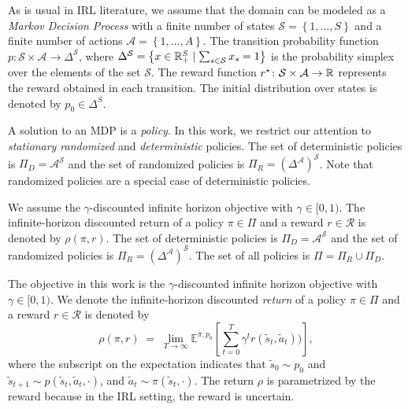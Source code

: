 \documentclass[10pt]{article}
\begin{document}

As is usual in IRL literature, we assume that the domain can be modeled as a \emph{Markov Decision Process} with a finite number of states $\mathcal{S} = \left\{ 1, \dots , S \right\}$ and a finite number of actions $\mathcal{A} = \left\{ 1, \dots , A \right\}$. The transition probability function $p\colon \mathcal{S} \times \mathcal{A} \to \Delta^{\mathcal{S}}$, where $\Delta^{\mathcal{S}} = \left\{ x\in \mathbb{R}_{+}^S \mid \sum_{s\in \mathcal{S}} x_s =1 \right\}$ is the probability simplex over the elements of the set $\mathcal{S}$. The reward function $r^{\mathnormal{\star}} \colon \mathcal{S} \times \mathcal{A} \to \mathbb{R}$ represents the reward obtained in each transition. The initial distribution over states is denoted by $p_0\in \Delta^S$. 

A solution to an MDP is a \emph{policy}. In this work, we restrict our attention to \emph{stationary randomized} and \emph{deterministic} policies. The set of deterministic policies is $\Pi_D= \mathcal{A}^{\mathcal{S}}$ and the set of randomized policies is $\Pi_R = {\left(\Delta^{\mathcal{A}}\right)}^{\mathcal{S}}$. Note that randomized policies are a special case of deterministic policies. 

We assume the $\gamma$-discounted infinite horizon objective with $\gamma \in [0,1)$. The infinite-horizon discounted return of a policy $\pi \in \Pi$ and a reward $r \in \mathcal{R}$ is denoted by $\rho(\pi, r)$. The set of deterministic policies is $\Pi_D= \mathcal{A}^{\mathcal{S}}$ and the set of randomized policies is $\Pi_R = {\left(\Delta^{\mathcal{A}}\right)}^{\mathcal{S}}$. The set of all policies is $\Pi = \Pi_R \cup \Pi_D$.

The objective in this work is the $\gamma$-discounted infinite horizon objective with $\gamma \in [0,1)$. We denote the  infinite-horizon discounted \emph{return} of a policy $\pi \in \Pi$ and a reward $r \in \mathcal{R}$ is denoted by 
\[
  \rho(\pi, r)
  \;=\; \lim_{T\to\infty} \mathbb{E}^{\pi, p_0} \left[   \sum_{t=0}^{T} \gamma^t r(\tilde{s}_t,\tilde{a}_t)) \right], 
\]
where the subscript on the expectation indicates that $\tilde{s}_0 \sim p_0$ and $\tilde{s}_{t+1} \sim p(\tilde{s}_t,\tilde{a}_t, \cdot)$, and $\tilde{a}_t \sim \pi(\tilde{s}_t, \cdot )$.  The return $\rho$ is parametrized by the reward because in the IRL setting, the reward is uncertain. 
\end{document}
